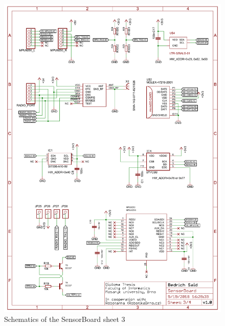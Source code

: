 \begin{figure}
	\centering
	\includegraphics[width=\linewidth]{img/sch3.pdf}
	\caption{Schematics of the SensorBoard sheet 3}
	\label{sch3}
\end{figure}

